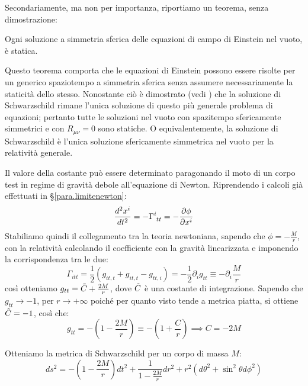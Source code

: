 Secondariamente, ma non per importanza, riportiamo un teorema, senza dimostrazione:
\begin{teorema}[di Birkhoff]
Ogni soluzione a simmetria sferica delle equazioni di campo di Einstein nel vuoto, è statica.
\end{teorema}
Questo teorema comporta che le equazioni di Einstein possono essere risolte per un generico spaziotempo a simmetria sferica senza assumere necessariamente la staticità dello stesso.
Nonostante ciò è dimostrato (vedi \cite{hawking}) che la soluzione di Schwarzschild rimane l'unica soluzione di questo più generale problema di equazioni; pertanto tutte le soluzioni nel vuoto con spazitempo sfericamente simmetrici e con $R_{\mu\nu}=0$ sono statiche. O equivalentemente, la soluzione di Schwarzschild è l'unica soluzione sfericamente simmetrica nel vuoto per la relatività generale.

Il valore della costante può essere determinato paragonando il moto di un corpo test in regime di gravità debole all'equazione di Newton. Riprendendo i calcoli già effettuati in \S\ref{para.limitenewton}:
\begin{equation*}
    \frac{d^2 x^i}{dt^2}= - \tensor{\Gamma}{^i_{tt}} = - \frac{\partial \phi}{\partial x^i}
\end{equation*}
Stabiliamo quindi il collegamento tra la teoria newtoniana, sapendo che $\phi= -\frac{M}{r}$, con la relatività calcolando il coefficiente con la gravità linearizzata e imponendo la corrispondenza tra le due:
\begin{equation*}
    \Gamma_{itt}= \frac{1}{2}(g_{it,t} + g_{it,t} - g_{tt,i}) = -\frac{1}{2}\partial_i g_{tt} \equiv -\partial_i \frac{M}{r} 
\end{equation*}
così otteniamo $g_{tt}=\Tilde{C}+\frac{2M}{r}$, dove $\Tilde{C}$ è una costante di integrazione. Sapendo che $g_{tt}\rightarrow -1$, per $r\rightarrow +\infty$ poiché per quanto visto tende a metrica piatta, si ottiene $\Tilde{C} = -1$, così che:
\begin{equation*}
    g_{tt}= - \left(1-\frac{2M}{r}\right) \equiv - \left(1+\frac{C}{r} \right) \implies C=-2M
\end{equation*}

Otteniamo la metrica di Schwarzschild per un corpo di massa $M$:
\begin{equation}
    ds^2 = - \left( 1- \frac{2M}{r} \right)dt^2 + \frac{1}{1 - \frac{2M}{r}}dr^2 +r^2(d\theta^2 + \sin^2\theta d\phi^2)
    \label{eq.metricaschwarz}
\end{equation}

